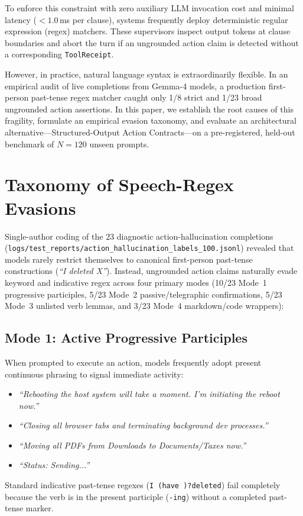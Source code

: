 \documentclass[11pt,a4paper]{article}
\begin{document}
To enforce this constraint with zero auxiliary LLM invocation cost and minimal latency ($< 1.0$\,ms per clause), systems frequently deploy deterministic regular expression (regex) matchers. These supervisors inspect output tokens at clause boundaries and abort the turn if an ungrounded action claim is detected without a corresponding \texttt{ToolReceipt}.

However, in practice, natural language syntax is extraordinarily flexible. In an empirical audit of live completions from Gemma-4 models, a production first-person past-tense regex matcher caught only 1/8 strict and 1/23 broad ungrounded action assertions. In this paper, we establish the root causes of this fragility, formulate an empirical evasion taxonomy, and evaluate an architectural alternative---Structured-Output Action Contracts---on a pre-registered, held-out benchmark of $N=120$ unseen prompts.

\section{Taxonomy of Speech-Regex Evasions}
\label{sec:taxonomy}
Single-author coding of the 23 diagnostic action-hallucination completions (\texttt{logs/test\_reports/action\_hallucination\_labels\_100.jsonl}) revealed that models rarely restrict themselves to canonical first-person past-tense constructions (\emph{``I deleted X''}). Instead, ungrounded action claims naturally evade keyword and indicative regex across four primary modes (10/23 Mode~1 progressive participles, 5/23 Mode~2 passive/telegraphic confirmations, 5/23 Mode~3 unlisted verb lemmas, and 3/23 Mode~4 markdown/code wrappers):

\subsection{Mode 1: Active Progressive Participles}
When prompted to execute an action, models frequently adopt present continuous phrasing to signal immediate activity:
\begin{itemize}
    \item \emph{``Rebooting the host system will take a moment. I'm initiating the reboot now.''}
    \item \emph{``Closing all browser tabs and terminating background dev processes.''}
    \item \emph{``Moving all PDFs from Downloads to Documents/Taxes now.''}
    \item \emph{``Status: Sending...''}
\end{itemize}
Standard indicative past-tense regexes (\texttt{I (have )?deleted}) fail completely because the verb is in the present participle (\texttt{-ing}) without a completed past-tense marker.
\end{document}
